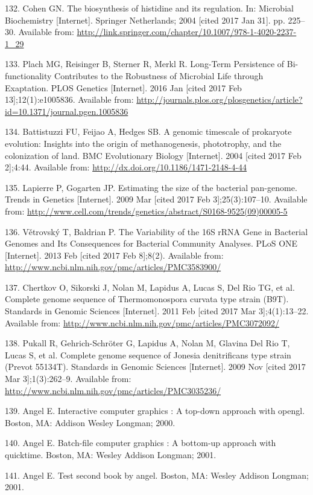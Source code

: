 \documentclass[12pt,twoside]{reedthesis}
\begin{document}
  \hypertarget{ref-cohen_biosynthesis_2004}{}
  132. Cohen GN. The biosynthesis of histidine and its regulation. In:
  Microbial Biochemistry {[}Internet{]}. Springer Netherlands; 2004
  {[}cited 2017 Jan 31{]}. pp. 225--30. Available from:
  \url{http://link.springer.com/chapter/10.1007/978-1-4020-2237-1_29}
  
  \hypertarget{ref-plach_long-term_2016}{}
  133. Plach MG, Reisinger B, Sterner R, Merkl R. Long-Term Persistence of
  Bi-functionality Contributes to the Robustness of Microbial Life through
  Exaptation. PLOS Genetics {[}Internet{]}. 2016 Jan {[}cited 2017 Feb
  13{]};12(1):e1005836. Available from:
  \url{http://journals.plos.org/plosgenetics/article?id=10.1371/journal.pgen.1005836}
  
  \hypertarget{ref-battistuzzi_genomic_2004}{}
  134. Battistuzzi FU, Feijao A, Hedges SB. A genomic timescale of
  prokaryote evolution: Insights into the origin of methanogenesis,
  phototrophy, and the colonization of land. BMC Evolutionary Biology
  {[}Internet{]}. 2004 {[}cited 2017 Feb 2{]};4:44. Available from:
  \url{http://dx.doi.org/10.1186/1471-2148-4-44}
  
  \hypertarget{ref-lapierre_estimating_2009}{}
  135. Lapierre P, Gogarten JP. Estimating the size of the bacterial
  pan-genome. Trends in Genetics {[}Internet{]}. 2009 Mar {[}cited 2017
  Feb 3{]};25(3):107--10. Available from:
  \url{http://www.cell.com/trends/genetics/abstract/S0168-9525(09)00005-5}
  
  \hypertarget{ref-vetrovsky_variability_2013}{}
  136. Větrovský T, Baldrian P. The Variability of the 16S rRNA Gene in
  Bacterial Genomes and Its Consequences for Bacterial Community Analyses.
  PLoS ONE {[}Internet{]}. 2013 Feb {[}cited 2017 Feb 8{]};8(2). Available
  from: \url{http://www.ncbi.nlm.nih.gov/pmc/articles/PMC3583900/}
  
  \hypertarget{ref-chertkov_complete_2011}{}
  137. Chertkov O, Sikorski J, Nolan M, Lapidus A, Lucas S, Del Rio TG, et
  al. Complete genome sequence of Thermomonospora curvata type strain
  (B9T). Standards in Genomic Sciences {[}Internet{]}. 2011 Feb {[}cited
  2017 Mar 3{]};4(1):13--22. Available from:
  \url{http://www.ncbi.nlm.nih.gov/pmc/articles/PMC3072092/}
  
  \hypertarget{ref-pukall_complete_2009}{}
  138. Pukall R, Gehrich-Schröter G, Lapidus A, Nolan M, Glavina Del Rio
  T, Lucas S, et al. Complete genome sequence of Jonesia denitrificans
  type strain (Prevot 55134T). Standards in Genomic Sciences
  {[}Internet{]}. 2009 Nov {[}cited 2017 Mar 3{]};1(3):262--9. Available
  from: \url{http://www.ncbi.nlm.nih.gov/pmc/articles/PMC3035236/}
  
  \hypertarget{ref-angel2000}{}
  139. Angel E. Interactive computer graphics : A top-down approach with
  opengl. Boston, MA: Addison Wesley Longman; 2000.
  
  \hypertarget{ref-angel2001}{}
  140. Angel E. Batch-file computer graphics : A bottom-up approach with
  quicktime. Boston, MA: Wesley Addison Longman; 2001.
  
  \hypertarget{ref-angel2002a}{}
  141. Angel E. Test second book by angel. Boston, MA: Wesley Addison
  Longman; 2001.


\end{document}
